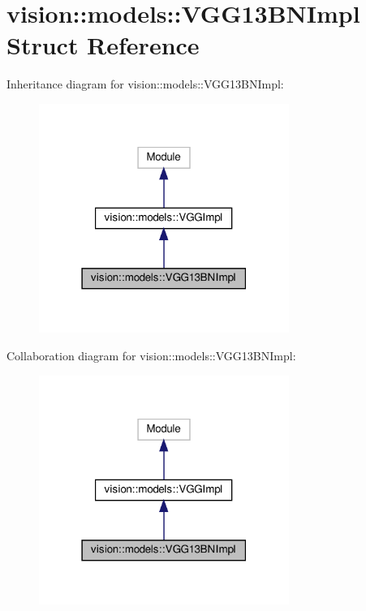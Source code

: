 \hypertarget{structvision_1_1models_1_1VGG13BNImpl}{}\section{vision\+:\+:models\+:\+:V\+G\+G13\+B\+N\+Impl Struct Reference}
\label{structvision_1_1models_1_1VGG13BNImpl}


Inheritance diagram for vision\+:\+:models\+:\+:V\+G\+G13\+B\+N\+Impl\+:
\nopagebreak
\begin{figure}[H]
\begin{center}
\leavevmode
\includegraphics[width=231pt]{structvision_1_1models_1_1VGG13BNImpl__inherit__graph}
\end{center}
\end{figure}


Collaboration diagram for vision\+:\+:models\+:\+:V\+G\+G13\+B\+N\+Impl\+:
\nopagebreak
\begin{figure}[H]
\begin{center}
\leavevmode
\includegraphics[width=231pt]{structvision_1_1models_1_1VGG13BNImpl__coll__graph}
\end{center}
\end{figure}
